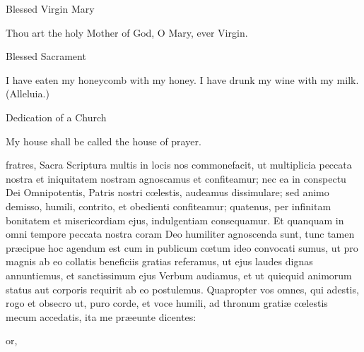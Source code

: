 \begin{multicols}{2}
\begin{inhead}
Blessed Virgin Mary
\end{inhead}\noindent
Thou art the holy Mother of God, O Mary, ever Virgin.

\begin{inhead}
Blessed Sacrament
\end{inhead}\noindent
I have eaten my honeycomb with my honey. I have drunk my wine with my milk. (Alleluia.)

\begin{inhead}
Dedication of a Church
\end{inhead}\noindent
	My house shall be called the house of prayer.
\end{multicols}
 fratres, Sacra Scriptura multis in locis nos commonefacit, ut multiplicia peccata nostra et iniquitatem nostram agnoscamus et confiteamur; nec ea in conspectu Dei Omnipotentis, Patris nostri cœlestis, audeamus dissimulare; sed animo demisso, humili, contrito, et obedienti confiteamur; quatenus, per infinitam bonitatem et misericordiam ejus, indulgentiam consequamur. Et quanquam in omni tempore peccata nostra coram Deo humiliter agnoscenda sunt, tunc tamen præcipue hoc agendum est cum in publicum cœtum ideo convocati sumus, ut pro magnis ab eo collatis beneficiis gratias referamus, ut ejus laudes dignas annuntiemus, et sanctissimum ejus Verbum audiamus, et ut quicquid animorum status aut corporis requirit ab eo postulemus. Quapropter vos omnes, qui adestis, rogo et obsecro ut, puro corde, et voce humili, ad thronum gratiæ cœlestis mecum accedatis, ita me præeunte dicentes:
\begin{inhead}
    or,
\end{inhead}
\par%
\noindent%

